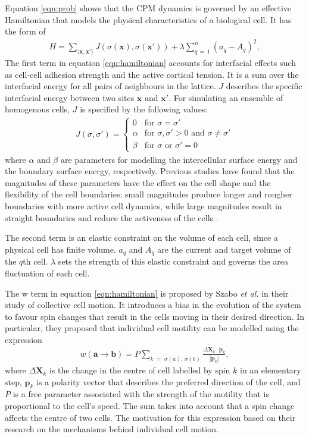 \documentclass[a4paper,12pt]{article}
\newcommand{\abs}[1]{\left|#1\right|}
\newcommand{\inc}{\Delta}
\newcommand{\etal}{\textit{et al.} }
\begin{document}
Equation \ref{eqn:prob} shows that the CPM dynamics is governed by an effective Hamiltonian that models the physical characteristics of a biological cell. It has the form of 
\begin{eqnarray}
\label{eqn:hamiltonian}
H = \sum_{\langle{\bm{x}, \bm{x'}\rangle}} J\left(\sigma(\bm{x}), \sigma(\bm{x'})\right) + \lambda \sum_{q\,=\,1}^{n} \left(a_q - A_q\right)^2,
\end{eqnarray}
The first term in equation \ref{eqn:hamiltonian} accounts for interfacial effects such as cell-cell adhesion strength and the active cortical tension. It is a sum over the interfacial energy for all pairs of neighbours in the lattice. $J$ describes the specific interfacial energy between two sites $\bm{x}$ and $\bm{x'}$. For simulating an ensemble of homogenous cells, $J$ is specified by the following values:
\begin{eqnarray}
\label{eqn:interfacial_energy}
J(\sigma,\sigma') = \left\{
	\begin {array}{ll}
		0 & \textrm{for $\sigma = \sigma'$}\\
		\alpha & \textrm{for $\sigma, \sigma' > 0$ and $\sigma \neq \sigma'$}\\
		\beta & \textrm{for $\sigma$ or $\sigma' = 0$}
	\end{array}
\right.
\end{eqnarray}
where $\alpha$ and $\beta$ are parameters for modelling the intercellular surface energy and the boundary surface energy, respectively. Previous studies have found that the magnitudes of these parameters have the effect on the cell shape and the flexibility of the cell boundaries: small magnitudes produce longer and rougher boundaries with more active cell dynamics, while large magnitudes result in straight boundaries and reduce the activeness of the cells \cite{szabo2010}.

The second term is an elastic constraint on the volume of each cell, since a physical cell has finite volume. $a_q$ and $A_q$ are the current and target volume of the $q$th cell. $
\lambda$ sets the strength of this elastic constraint and governs the area fluctuation of each cell.

The w term in equation \ref{eqn:hamiltonian} is proposed by Szabo \etal in their study of collective cell motion\cite{szabo2010}. It introduces a bias in the evolution of the system to favour spin changes that result in the cells moving in their desired direction. In particular, they proposed that individual cell motility can be modelled using the expression 
\begin{eqnarray}
w (\bm{a} \rightarrow \bm{b}) = P \sum_{k \;=\; \sigma(a),\,\sigma(b)} \frac{\inc \bm{X}_k \cdot \bm{p}_k}{\abs{\bm{p}_k}},
\end{eqnarray}
where $\inc \bm{X}_k$ is the change in the centre of cell labelled by spin $k$ in an elementary step, $\bm{p}_k$ is a polarity vector that describes the preferred direction of the cell, and $P$ is a free parameter associated with the strength of the motility that is proportional to the cell's speed. The sum takes into account that a spin change affects the centre of two cells. The motivation for this expression based on their research on the mechanisms behind individual cell motion. 
\end{document}
